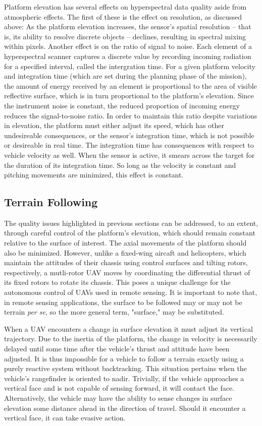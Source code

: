 \documentclass[10pt]{report}
\begin{document}
Platform elevation has several effects on hyperspectral data quality aside from atmospheric effects. The first of these is the effect on resolution, as discussed above: As the platform elevation increases, the sensor's spatial resolution -- that is, its ability to resolve discrete objects -- declines, resulting in spectral mixing within pixels. Another effect is on the ratio of signal to noise. Each element of a hyperspectral scanner captures a discrete value by recording incoming radiation for a specified interval, called the intergration time. For a given platform velocity and integration time (which are set during the planning phase of the mission), the amount of energy received by an element is proportional to the area of visible reflective surface, which is in turn proportional to the platform's elevation. Since the instrument noise is constant, the reduced proportion of incoming energy reduces the signal-to-noise ratio. In order to maintain this ratio despite variations in elevation, the platform must either adjust its speed, which has other undesireable consequences, or the sensor's integration time, which is not possible or desireable in real time. The integration time has consequences with respect to vehicle velocity as well. When the sensor is active, it smears across the target for the duration of its integration time. So long as the velocity is constant and pitching movements are minimized, this effect is constant.

\subsection{Terrain Following}

The quality issues highlighted in previous sections can be addressed, to an extent, through careful control of the platform's elevation, which should remain constant relative to the surface of interest. The axial movements of the platform should also be minimized. However, unlike a fixed-wing aircaft and helicopters, which maintain the attitudes of their chassis using control surfaces and tilting rotors, respectively, a mutli-rotor UAV moves by coordinating the differential thrust of its fixed rotors to rotate its chassis. This poses a unique challenge for the autonomous control of UAVs used in remote sensing. It is important to note that, in remote sensing applications, the surface to be followed may or may not be terrain \emph{per se}, so the more general term, "surface," may be substituted.

When a UAV encounters a change in surface elevation it must adjust its vertical trajectory. Due to the inertia of the platform, the change in velocity is necessarily delayed until some time after the vehicle's thrust and attitude have been adjusted. It is thus impossible for a vehicle to follow a terrain exactly using a purely reactive system without backtracking. This situation pertains when the vehicle's rangefinder is oriented to nadir. Trivially, if the vehicle approaches a vertical face and is not capable of sensing forward, it will contact the face.  Alternatively, the vehicle may have the ability to sense changes in surface elevation some distance ahead in the direction of travel. Should it encounter a vertical face, it can take evasive action.
\end{document}
